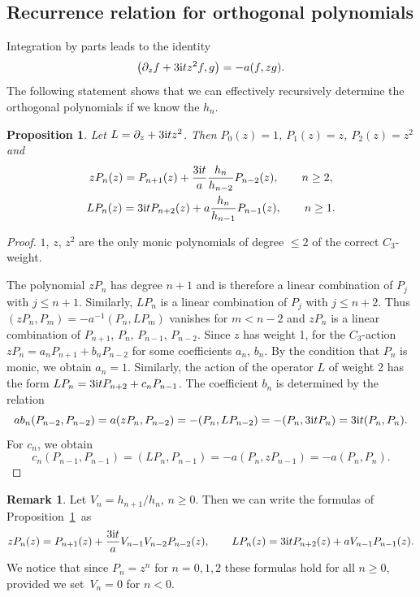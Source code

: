 \documentclass[10pt,a4paper]{amsart}
\numberwithin{equation}{section}
\newtheorem{Proposition}[Theorem]{Proposition}
\theoremstyle{definition}
\newtheorem{Remark}[Theorem]{Remark}
\begin{document}
\subsection{Recurrence relation for orthogonal polynomials}
Integration by parts leads to the identity
\begin{equation}\label{e-0}
\bigl(\partial_zf+3{\rm i}tz^2f,g\bigr)=-a(f,zg).
\end{equation}
The following statement shows that we can effectively recursively determine the orthogonal polynomials if we know the $h_n$.
\begin{Proposition}\label{p-1} Let $L=\partial_z+3{\rm i}tz^2$. Then $P_0(z)=1$, $P_1(z)=z$, $P_2(z)=z^2$ and
 \begin{gather*}
 zP_n(z) = P_{n+1}(z)+\frac{3{\rm i}t}{a}\frac{h_n}{h_{n-2}}P_{n-2}(z),\qquad n\geq2,
 \\
 LP_n(z) = 3{\rm i}t P_{n+2}(z)+a\frac{h_n}{h_{n-1}}P_{n-1}(z),\qquad n\geq1.
 \end{gather*}
\end{Proposition}
\begin{proof}
 $1$, $z$, $z^2$ are the only monic polynomials of degree $\leq2$ of the correct $C_3$-weight.

 The polynomial $zP_n$ has degree $n+1$ and is therefore a linear combination of $P_j$ with $j\leq n+1$. Similarly, $LP_n$ is a linear combination of $P_j$ with $j\leq n+2$. Thus $(zP_n,P_m)=-a^{-1}(P_n,LP_m)$ vanishes for $m<n-2$ and $zP_n$ is a linear combination of $P_{n+1}$, $P_n$, $P_{n-1}$, $P_{n-2}$. Since $z$ has weight 1, for the $C_3$-action
 $ zP_n=a_nP_{n+1}+b_nP_{n-2}$
 for some coefficients $a_n$, $b_n$.
 By the condition that $P_n$ is monic, we obtain $a_n=1$. Similarly, the action of the operator $L$ of weight 2 has the form
 $
 LP_n=3{\rm i}t P_{n+2}+c_nP_{n-1}$.
 The coefficient $b_n$ is determined by the relation
 \[
 ab_n(P_{n-2},P_{n-2})=a(zP_n,P_{n-2})=-(P_n,LP_{n-2})=-(P_n,3{\rm i}t P_n)=3{\rm i}t(P_n,P_n).
 \]
 For $c_n$, we obtain
 \[
 c_n(P_{n-1},P_{n-1})=(LP_n,P_{n-1})=-a(P_n,zP_{n-1})=-a(P_n,P_n).\tag*{\qed}
 \]
 \renewcommand{\qed}{}
\end{proof}

\begin{Remark}\label{r-1}
 Let $V_n=h_{n+1}/h_n$, $n\geq0$. Then we can write the formulas of Proposition~\ref{p-1}~as
 \begin{align*}
 zP_n(z) = P_{n+1}(z)+\frac{3{\rm i}t}{a}V_{n-1}V_{n-2}P_{n-2}(z),
 \qquad
 LP_n(z) = 3{\rm i}t P_{n+2}(z)+aV_{n-1}P_{n-1}(z).
 \end{align*}
 We notice that since $P_n=z^n$ for $n=0,1,2$ these formulas hold for all $n\geq0$, provided we set~${V_{n}=0}$ for $n<0$.
\end{Remark}
\end{document}
